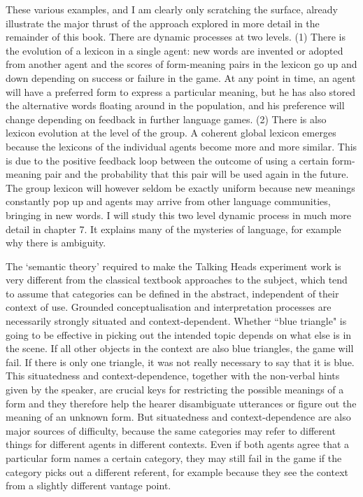 These various examples, and I am clearly only 
scratching the surface, already illustrate the major thrust of the 
approach explored in more detail in the remainder of this book. 
There are dynamic processes at two levels. (1) There is 
the evolution of a lexicon in a single agent: new words are
invented or adopted from another agent and the
scores of form-meaning pairs in the lexicon
go up and down depending on success or
failure in the game. At any point in time, an agent 
will have a preferred form to express a particular meaning, 
but he has also stored the alternative words floating around in the 
population, and his preference will change depending on feedback
in further language games. (2) There is also lexicon evolution at 
the level of the group. A coherent global lexicon emerges because
the lexicons of the individual agents become more and more 
similar. This is due to the positive feedback loop between
the outcome of using
a certain form-meaning pair and the probability that
this pair will be used again in the future. 
The group lexicon will however seldom be exactly uniform because
new meanings constantly pop up and agents may arrive from 
other language communities, bringing in new words. 
I will study this two level dynamic process in much more detail 
in chapter 7. It explains many of the mysteries of
language, for example why there is ambiguity. 

The `semantic theory' required to make the 
Talking Heads experiment work is very different from 
the classical textbook approaches to the subject, which
tend to assume that categories can be defined in the 
abstract, independent of their context of use. Grounded
conceptualisation and interpretation processes are necessarily 
strongly situated and context-dependent. Whether ``blue 
triangle" is going to be effective in picking out the 
intended topic depends on what else is in
the scene. If all other objects in the 
context are also blue triangles, the game will fail. If there
is only one triangle, it was not really necessary to say that 
it is blue. This situatedness and context-dependence, together with 
the non-verbal hints given by the speaker, are crucial 
keys for restricting the 
possible meanings of a form 
and they therefore help the hearer disambiguate 
utterances or figure out the meaning of an unknown form. But situatedness 
and context-dependence are also major
sources of difficulty, because the same categories may
refer to different things for different agents in different
contexts. Even if both agents agree that a particular form 
names a certain category, 
they may still fail in the game if the category picks
out a different referent, for example because they see 
the context from a slightly different vantage point. 

